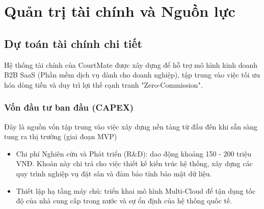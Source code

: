 \section{Quản trị tài chính và Nguồn lực}

\subsection{Dự toán tài chính chi tiết}
Hệ thống tài chính của CourtMate được xây dựng để hỗ trợ mô hình kinh doanh B2B SaaS (Phần mềm dịch vụ dành cho doanh nghiệp), tập trung vào việc tối ưu hóa dòng tiền và duy trì lợi thế cạnh tranh "Zero-Commission".
\subsubsection{Vốn đầu tư ban đầu (CAPEX)}
Đây là nguồn vốn tập trung vào việc xây dựng nền tảng từ đầu đến khi sẵn sàng tung ra thị trường (giai đoạn MVP)
\begin{itemize}
    \item Chi phí Nghiên cứu và Phát triển (R\&D): dao động khoảng 150 - 200 triệu VNĐ. Khoản này chi trả cho việc thiết kế kiến trúc hệ thống, xây dựng các quy trình nghiệp vụ đặt sân và đảm bảo tính bảo mật dữ liệu.
    \item Thiết lập hạ tầng máy chủ: triển khai mô hình Multi-Cloud để tận dụng tốc độ của nhà cung cấp trong nước và sự ổn định của hệ thống quốc tế.
\end{itemize}

